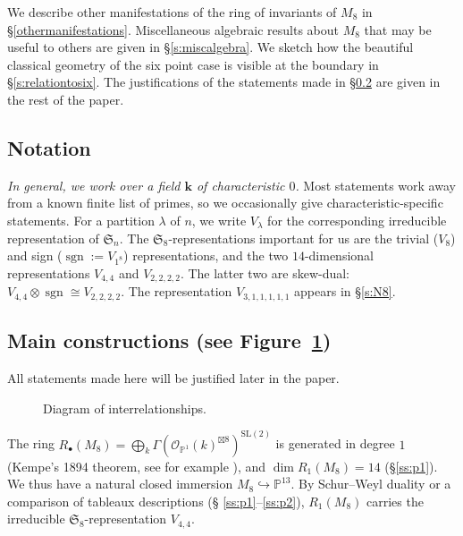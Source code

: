 \documentclass{amsart}
\theoremstyle{definition}
\theoremstyle{remark}
\DeclareMathOperator{\sgn}{sgn}
\def\SL{\mathrm{SL}}
\def\SS{\mathfrak{S}}
\def\fieldk{\mathbf{k}}
\def\proj{\mathbb{P}}
\begin{document}
We describe other manifestations of the ring of invariants of $M_8$ in \S \ref{othermanifestations}.  Miscellaneous
algebraic results about $M_8$ that may be useful to others are given in \S \ref{s:miscalgebra}.  We sketch how the
beautiful classical geometry of the six point case is visible at the boundary in \S \ref{s:relationtosix}.  The
justifications of the statements made in \S \ref{mainconstructions} are given in the rest of the paper.

\subsection{Notation}
{\em In general, we work over a  field $\fieldk$ of characteristic $0$.}  Most statements work away from a known
finite list of primes, so we occasionally give characteristic-specific statements.  For a partition $\lambda$ of $n$,
we write $V_{\lambda}$ for the corresponding irreducible representation of $\SS_n$.  The $\SS_8$-representations
important for us are the trivial ($V_8$) and sign ($\sgn := V_{1^8}$) representations, and the two $14$-dimensional
representations $V_{4,4}$ and  $V_{2,2,2,2}$.  The latter two are
skew-dual: $V_{4,4} \otimes \sgn \cong V_{2,2,2,2}$.  The
representation $V_{3,1,1,1,1,1}$ appears in \S \ref{s:N8}.

\subsection{Main constructions (see Figure~\ref{f:figureeight}) }
\label{mainconstructions}

All statements made here will be justified later in the paper.
\begin{figure}[ht]
\begin{center}

\end{center}
\caption{Diagram of interrelationships.}
\label{f:figureeight}
\end{figure}


The ring $R_{\bullet}(M_8) = \bigoplus_k \Gamma(\mathcal{O}_{\proj^1}(k)^{\boxtimes 8})^{\SL(2)}$ is generated in
degree $1$ (Kempe's 1894 theorem, see for example \cite[Thm.~2.3]{hmsv1}), and $\dim R_1(M_8) = 14$ (\S \ref{ss:p1}).
We thus have a natural closed immersion  $M_8 \hookrightarrow \proj^{13}$.
By Schur--Weyl duality or a comparison of
tableaux descriptions  (\S
\ref{ss:p1}--\ref{ss:p2}), $R_1(M_8)$ carries the irreducible $\SS_8$-representation $V_{4,4}$.
\end{document}
